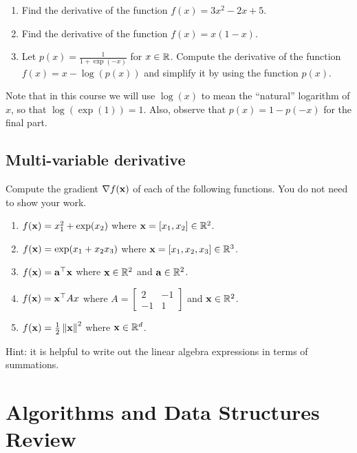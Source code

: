 \begin{enumerate}
    \item Find the derivative of the function $f(x) = 3x^2 -2x + 5$.
    \solution{}
    
    \item Find the derivative of the function $f(x) = x(1-x)$.
    \solution{}
    
    \item Let $p(x) = \frac{1}{1+\exp(-x)}$ for $x \in \mathbb{R}$. Compute the derivative of the function $f(x) = x-\log(p(x))$ and simplify it by using the function $p(x)$.
    \solution{}
\end{enumerate}
Note that in this course we will use $\log(x)$ to mean the ``natural'' logarithm of $x$, so that $\log(\exp(1)) = 1$. Also, observe that $p(x) = 1-p(-x)$ for the final part.

\subsection{Multi-variable derivative}

Compute the gradient $\nabla f(\mathbf{x})$ of each of the following functions. You do not need to show your work.
\begin{enumerate}
    \item $f(\mathbf{x}) = x_1^2 + \exp(x_2)$ where $\mathbf{x} = [x_1, x_2] \in \mathbb{R}^2$.
    \solution{}
    
    \item $f(\mathbf{x}) = \exp(x_1 + x_2x_3)$ where $\mathbf{x} = [x_1, x_2, x_3] \in \mathbb{R}^3$.
    \solution{}
    
    \item $f(\mathbf{x}) = \mathbf{a}^\top \mathbf{x}$ where $\mathbf{x} \in \mathbb{R}^2$ and $\mathbf{a} \in \mathbb{R}^2$.
    \solution{}
    
    \item $f(\mathbf{x}) = \mathbf{x}^\top A x$ where $A=\left[ \begin{array}{cc}
        2 & -1 \\
        -1 & 1
    \end{array} \right]$ and $\mathbf{x} \in \mathbb{R}^2$.
    \solution{}

    \item $f(\mathbf{x}) = \frac{1}{2}\left\|\mathbf{x} \right\|^2$ where $\mathbf{x} \in \mathbb{R}^d$.
    \solution{}
\end{enumerate}

Hint: it is helpful to write out the linear algebra expressions in terms of summations.


\newpage
\section{Algorithms and Data Structures Review}

